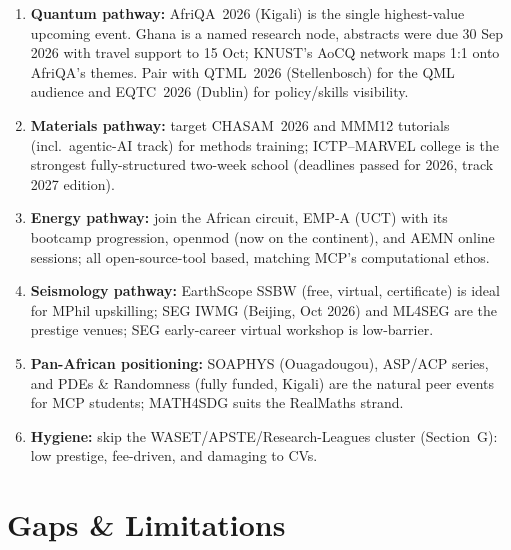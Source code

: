 \documentclass[11pt,a4paper]{article}
\begin{document}
\begin{enumerate}[leftmargin=1.8em]
  \item \textbf{Quantum pathway:} AfriQA~2026 (Kigali) is the single highest-value upcoming event. Ghana is a named research node, abstracts were due 30 Sep 2026 with travel support to 15 Oct; KNUST's AoC\textbar Q network maps 1:1 onto AfriQA's themes. Pair with QTML~2026 (Stellenbosch) for the QML audience and EQTC~2026 (Dublin) for policy/skills visibility.
  \item \textbf{Materials pathway:} target CHASAM~2026 and MMM12 tutorials (incl.\ agentic-AI track) for methods training; ICTP--MARVEL college is the strongest fully-structured two-week school (deadlines passed for 2026, track 2027 edition).
  \item \textbf{Energy pathway:} join the African circuit, EMP-A (UCT) with its bootcamp progression, openmod (now on the continent), and AEMN online sessions; all open-source-tool based, matching MCP's computational ethos.
  \item \textbf{Seismology pathway:} EarthScope SSBW (free, virtual, certificate) is ideal for MPhil upskilling; SEG IWMG (Beijing, Oct 2026) and ML4SEG are the prestige venues; SEG early-career virtual workshop is low-barrier.
  \item \textbf{Pan-African positioning:} SOAPHYS (Ouagadougou), ASP/ACP series, and PDEs \& Randomness (fully funded, Kigali) are the natural peer events for MCP students; MATH4SDG suits the RealMaths strand.
  \item \textbf{Hygiene:} skip the WASET/APSTE/Research-Leagues cluster (Section~G): low prestige, fee-driven, and damaging to CVs.
\end{enumerate}

\section{Gaps \& Limitations}
\end{document}
